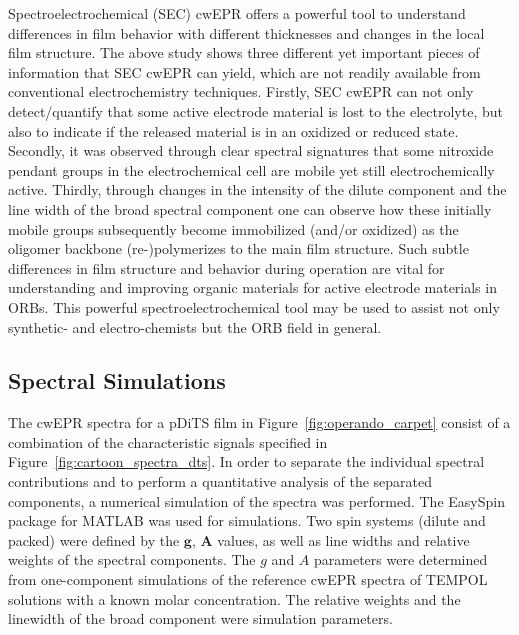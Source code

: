 \par
Spectroelectrochemical (SEC) cwEPR offers a powerful tool to understand differences in film behavior with different thicknesses and changes in the local film structure. The above study shows three different yet important pieces of information that SEC cwEPR can yield, which are not readily available from conventional electrochemistry techniques. Firstly, SEC cwEPR can not only detect/quantify that some active electrode material is lost to the electrolyte, but also to indicate if the released material is in an oxidized or reduced state. Secondly, it was observed through clear spectral signatures that some nitroxide pendant groups in the electrochemical cell are mobile yet still electrochemically active. Thirdly, through changes in the intensity of the dilute component and the line width of the broad spectral component one can observe how these initially mobile groups subsequently become immobilized (and/or oxidized) as the oligomer backbone (re-)polymerizes to the main film structure. Such subtle differences in film structure and behavior during operation are vital for understanding and improving organic materials for active electrode materials in ORBs. This powerful spectroelectrochemical tool may be used to assist not only synthetic- and electro-chemists but the ORB field in general.
%


\subsection{Spectral Simulations}
The cwEPR spectra for a pDiTS film in Figure~\ref{fig:operando_carpet} consist of a combination of the characteristic signals specified in Figure~\ref{fig:cartoon_spectra_dts}. In order to separate the individual spectral contributions and to perform a quantitative analysis of the separated components, a numerical simulation of the spectra was performed. The EasySpin package for MATLAB was used for simulations. Two spin systems (dilute and packed) were defined by the $\textbf{g}$, $\textbf{A}$ values, as well as line widths and relative weights of the spectral components. The $g$ and $A$ parameters were determined from one-component simulations of the reference cwEPR spectra of TEMPOL solutions with a known molar concentration. The relative weights and the linewidth of the broad component were simulation parameters.


